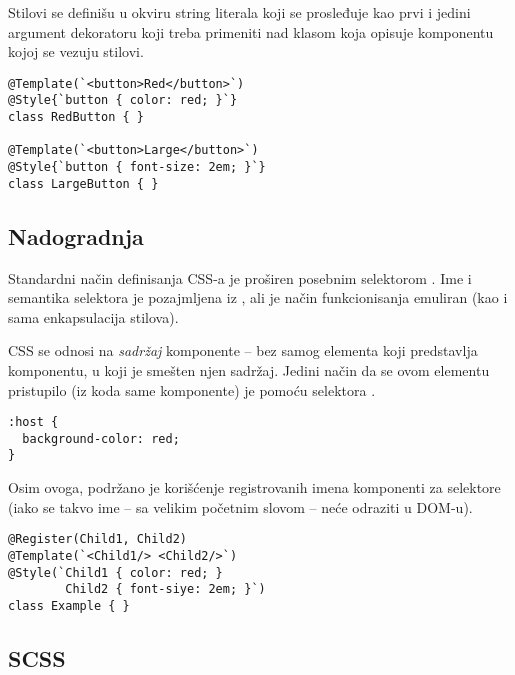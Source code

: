 Stilovi se definišu u okviru string literala koji se prosleđuje kao prvi i jedini argument dekoratoru  koji treba primeniti nad klasom koja opisuje komponentu kojoj se vezuju stilovi.

\begin{verbatim}
@Template(`<button>Red</button>`)
@Style{`button { color: red; }`}
class RedButton { }

@Template(`<button>Large</button>`)
@Style{`button { font-size: 2em; }`}
class LargeButton { }
\end{verbatim}

\subsection{Nadogradnja}

Standardni način definisanja CSS-a je proširen posebnim selektorom .
Ime i semantika selektora je pozajmljena iz \cite[\S3.2]{w3c:css-scoping-1}, ali je način funkcionisanja emuliran (kao i sama enkapsulacija stilova).

CSS se odnosi na \emph{sadržaj} komponente -- bez samog elementa koji predstavlja komponentu, u koji je smešten njen sadržaj.
Jedini način da se ovom elementu pristupilo  (iz koda same komponente) je pomoću selektora .

\begin{verbatim}
:host {
  background-color: red;
}
\end{verbatim}

Osim ovoga, podržano je korišćenje registrovanih imena komponenti za selektore (iako se takvo ime -- sa velikim početnim slovom -- neće odraziti u DOM-u).

\begin{verbatim}
@Register(Child1, Child2)
@Template(`<Child1/> <Child2/>`)
@Style(`Child1 { color: red; }
        Child2 { font-siye: 2em; }`)
class Example { }
\end{verbatim}



\subsection{SCSS}

